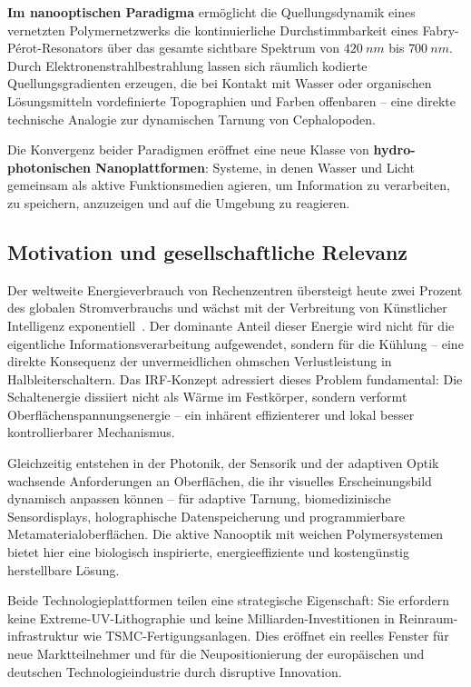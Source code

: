 ﻿\documentclass[a4paper,12pt]{scrreprt}
\theoremstyle{definition}
\begin{document}
\textbf{Im nanooptischen Paradigma} ermöglicht die Quellungsdynamik eines
vernetzten Polymernetzwerks die kontinuierliche Durchstimmbarkeit eines
Fabry-P{\'e}rot-Resonators über das gesamte sichtbare Spektrum von
$\SI{420}{nm}$ bis $\SI{700}{nm}$. Durch Elektronenstrahlbestrahlung lassen
sich räumlich kodierte Quellungsgradienten erzeugen, die bei Kontakt mit
Wasser oder organischen Lösungsmitteln vordefinierte Topographien und
Farben offenbaren -- eine direkte technische Analogie zur dynamischen
Tarnung von Cephalopoden.

Die Konvergenz beider Paradigmen eröffnet eine neue Klasse von
\textbf{hydro-photonischen Nanoplattformen}: Systeme, in denen Wasser und
Licht gemeinsam als aktive Funktionsmedien agieren, um Information zu
verarbeiten, zu speichern, anzuzeigen und auf die Umgebung zu reagieren.

\subsection{Motivation und gesellschaftliche Relevanz}

Der weltweite Energieverbrauch von Rechenzentren übersteigt heute zwei Prozent
des globalen Stromverbrauchs und wächst mit der Verbreitung von Künstlicher
Intelligenz exponentiell~\cite{iea2023}. Der dominante Anteil dieser Energie
wird nicht für die eigentliche Informationsverarbeitung aufgewendet, sondern
für die Kühlung -- eine direkte Konsequenz der unvermeidlichen ohmschen
Verlustleistung in Halbleiterschaltern. Das IRF-Konzept adressiert dieses
Problem fundamental: Die Schaltenergie dissiiert nicht als Wärme im Festkörper,
sondern verformt Oberflächenspannungsenergie -- ein inhärent effizienterer
und lokal besser kontrollierbarer Mechanismus.

Gleichzeitig entstehen in der Photonik, der Sensorik und der adaptiven Optik
wachsende Anforderungen an Oberflächen, die ihr visuelles Erscheinungsbild
dynamisch anpassen können -- für adaptive Tarnung, biomedizinische
Sensordisplays, holographische Datenspeicherung und programmierbare
Metamaterialoberflächen. Die aktive Nanooptik mit weichen Polymersystemen
bietet hier eine biologisch inspirierte, energieeffiziente und kostengünstig
herstellbare Lösung.

Beide Technologieplattformen teilen eine strategische Eigenschaft: Sie erfordern
keine Extreme-UV-Lithographie und keine Milliarden-Investitionen in Reinraum-
infrastruktur wie TSMC-Fertigungsanlagen. Dies eröffnet ein reelles Fenster für
neue Marktteilnehmer und für die Neupositionierung der europäischen und deutschen
Technologieindustrie durch disruptive Innovation.
\end{document}
